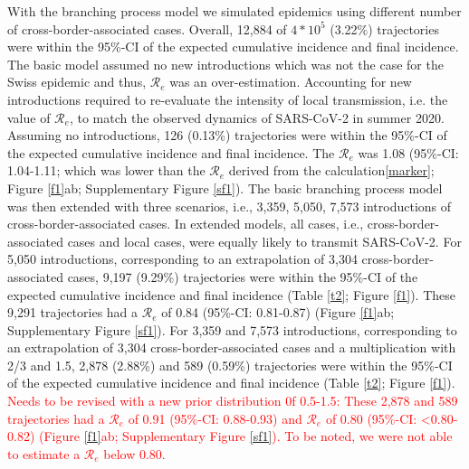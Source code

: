 \documentclass[10pt, a4paper, twoside]{article}
\begin{document}
\begin{multicols}{2}
\begin{figure}
\label{f2}
\end{figure}

With the branching process model we simulated epidemics using different number of cross-border-associated cases.
Overall, 12,884 of $4*10^5$ (3.22\%) trajectories were within the 95\%-CI of the expected cumulative incidence and final incidence.
The basic model assumed no new introductions which was not the case for the Swiss epidemic and thus, $\mathcal{R}_e$ was an over-estimation.
Accounting for new introductions required to re-evaluate the intensity of local transmission, i.e. the value of $\mathcal{R}_e$, to match the observed dynamics of SARS-CoV-2 in summer 2020.
Assuming no introductions, 126 (0.13\%) trajectories were within the 95\%-CI of the expected cumulative incidence and final incidence.
The $\mathcal{R}_e$ was 1.08 (95\%-CI: 1.04-1.11; which was lower than the $\mathcal{R}_e$ derived from the calculation\ref{marker}; Figure \ref{f1}ab; Supplementary Figure \ref{sf1}).
The basic branching process model was then extended with three scenarios, i.e., 3,359, 5,050, 7,573 introductions of cross-border-associated cases.
In extended models, all cases, i.e., cross-border-associated cases and local cases, were equally likely to transmit SARS-CoV-2.
For 5,050 introductions, corresponding to an extrapolation of 3,304 cross-border-associated cases, 9,197 (9.29\%) trajectories were within the 95\%-CI of the expected cumulative incidence and final incidence (Table \ref{t2}; Figure \ref{f1}).
These 9,291 trajectories had a $\mathcal{R}_e$ of 0.84 (95\%-CI: 0.81-0.87) (Figure \ref{f1}ab; Supplementary Figure \ref{sf1}).
For 3,359 and 7,573 introductions, corresponding to an extrapolation of 3,304 cross-border-associated cases and a multiplication with 2/3 and 1.5, 2,878 (2.88\%) and 589 (0.59\%) trajectories were within the 95\%-CI of the expected cumulative incidence and final incidence (Table \ref{t2}; Figure \ref{f1}).
\textcolor{red}{Needs to be revised with a new prior distribution 0f 0.5-1.5: 
These 2,878 and 589 trajectories had a $\mathcal{R}_e$ of 0.91 (95\%-CI: 0.88-0.93) and $\mathcal{R}_e$ of 0.80 (95\%-CI: <0.80-0.82) (Figure \ref{f1}ab; Supplementary Figure \ref{sf1}).
To be noted, we were not able to estimate a $\mathcal{R}_e$ below 0.80.}



\end{multicols}
\end{document}
